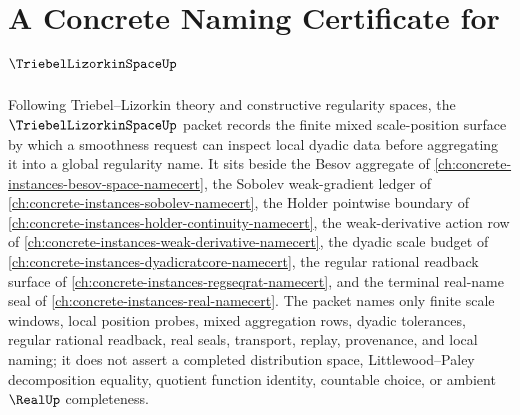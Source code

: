 \chapter{A Concrete Naming Certificate for $\TriebelLizorkinSpaceUp$}
\label{ch:concrete-instances-triebel-lizorkin-space-namecert}

Following Triebel--Lizorkin theory and constructive regularity spaces, the $\TriebelLizorkinSpaceUp$ packet records the finite mixed scale-position surface by which a smoothness request can inspect local dyadic data before aggregating it into a global regularity name. It sits beside the Besov aggregate of \autoref{ch:concrete-instances-besov-space-namecert}, the Sobolev weak-gradient ledger of \autoref{ch:concrete-instances-sobolev-namecert}, the Holder pointwise boundary of \autoref{ch:concrete-instances-holder-continuity-namecert}, the weak-derivative action row of \autoref{ch:concrete-instances-weak-derivative-namecert}, the dyadic scale budget of \autoref{ch:concrete-instances-dyadicratcore-namecert}, the regular rational readback surface of \autoref{ch:concrete-instances-regseqrat-namecert}, and the terminal real-name seal of \autoref{ch:concrete-instances-real-namecert}. The packet names only finite scale windows, local position probes, mixed aggregation rows, dyadic tolerances, regular rational readback, real seals, transport, replay, provenance, and local naming; it does not assert a completed distribution space, Littlewood--Paley decomposition equality, quotient function identity, countable choice, or ambient $\RealUp$ completeness.

